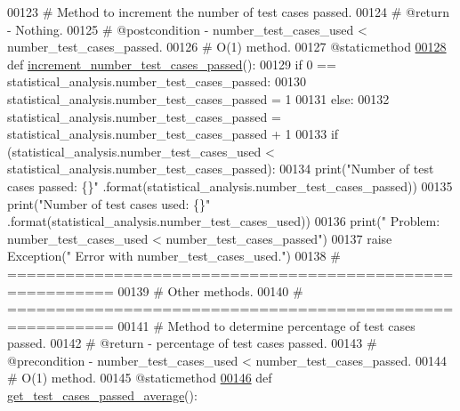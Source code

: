 \begin{DoxyCode}
00123     \textcolor{comment}{#   Method to increment the number of test cases passed.}
00124     \textcolor{comment}{#   @return - Nothing.}
00125     \textcolor{comment}{#   @postcondition - number\_test\_cases\_used < number\_test\_cases\_passed.}
00126     \textcolor{comment}{#   O(1) method.}
00127     @staticmethod
\hypertarget{test__statistics_8py_source_l00128}{}\hyperlink{classstatistics_1_1test__statistics_1_1statistical__analysis_a056f55c0e7f60e29d4b37e8e74d3cd08}{00128}     \textcolor{keyword}{def }\hyperlink{classstatistics_1_1test__statistics_1_1statistical__analysis_a056f55c0e7f60e29d4b37e8e74d3cd08}{increment\_number\_test\_cases\_passed}():
00129         \textcolor{keywordflow}{if} 0 == statistical\_analysis.number\_test\_cases\_passed:
00130             statistical\_analysis.number\_test\_cases\_passed = 1
00131         \textcolor{keywordflow}{else}:
00132             statistical\_analysis.number\_test\_cases\_passed = statistical\_analysis.number\_test\_cases\_passed +
       1
00133         \textcolor{keywordflow}{if} (statistical\_analysis.number\_test\_cases\_used < statistical\_analysis.number\_test\_cases\_passed):
00134             print(\textcolor{stringliteral}{"Number of test cases passed: \{\}"} .format(statistical\_analysis.number\_test\_cases\_passed))
00135             print(\textcolor{stringliteral}{"Number of test cases used:   \{\}"} .format(statistical\_analysis.number\_test\_cases\_used))
00136             print(\textcolor{stringliteral}{" Problem: number\_test\_cases\_used < number\_test\_cases\_passed"})
00137             \textcolor{keywordflow}{raise} Exception(\textcolor{stringliteral}{"   Error with number\_test\_cases\_used."})
00138     \textcolor{comment}{# =========================================================}
00139     \textcolor{comment}{#   Other methods.}
00140     \textcolor{comment}{# =========================================================}
00141     \textcolor{comment}{#   Method to determine percentage of test cases passed.}
00142     \textcolor{comment}{#   @return - percentage of test cases passed.}
00143     \textcolor{comment}{#   @precondition - number\_test\_cases\_used < number\_test\_cases\_passed.}
00144     \textcolor{comment}{#   O(1) method.}
00145     @staticmethod
\hypertarget{test__statistics_8py_source_l00146}{}\hyperlink{classstatistics_1_1test__statistics_1_1statistical__analysis_a1bec04d2404b2bdf277c4ba170abb4a1}{00146}     \textcolor{keyword}{def }\hyperlink{classstatistics_1_1test__statistics_1_1statistical__analysis_a1bec04d2404b2bdf277c4ba170abb4a1}{get\_test\_cases\_passed\_average}():

\end{DoxyCode}
